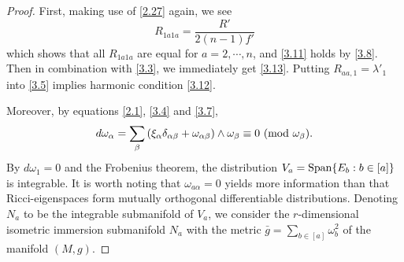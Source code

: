 \documentclass{amsart}
\theoremstyle{definition}
\theoremstyle{remark}
\numberwithin{equation}{section}
\begin{document}
	\begin{proof}
		First, making use of \eqref{2.27} again, we see
		\[ 
		R_{1a1a}=\frac{R'}{2(n-1)f'} 
		\]
		which shows that all $R_{1a1a}$ are equal for $a=2, \cdots, n$, and \eqref{3.11} holds by \eqref{3.8}.
		Then in combination with \eqref{3.3}, we immediately
		get \eqref{3.13}. Putting $R_{aa,1}=\lambda'_1$ into \eqref{3.5} implies harmonic condition \eqref{3.12}.

   Moreover, by equations \eqref{2.1}, \eqref{3.4} and \eqref{3.7}, 
    \[
    d\omega_\alpha=\sum_\beta\left( \xi_\alpha\delta_{\alpha\beta}
    +\omega_{\alpha\beta} \right) \wedge \omega_{\beta}  \equiv 0 
     ~ ( {\rm mod} ~ \omega_\beta).
     \]
    By $d\omega_1=0$ and the Frobenius theorem, the distribution
     $V_a={\rm Span} \{E_b: b\in [a] \} $ is integrable.
    It is worth noting that $\omega_{a\alpha}=0$ yields more information than that Ricci-eigenspaces form mutually orthogonal differentiable distributions. Denoting $N_a$ to be the integrable submanifold of $V_a$, 
    we consider the $r$-dimensional isometric immersion submanifold $N_a$ with the metric 
      $\bar{g}=\sum_{b \in [a]} \omega^2_{b}$
    of the manifold $(M,g)$.
		

\end{proof}
\end{document}
